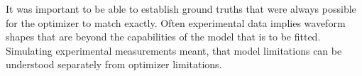 It was important to be able to establish ground truths that were always possible for the optimizer to match exactly. Often experimental data implies waveform shapes that are beyond the capabilities of the model that is to be fitted. Simulating experimental measurements meant, that model limitations can be understood separately from optimizer limitations.

